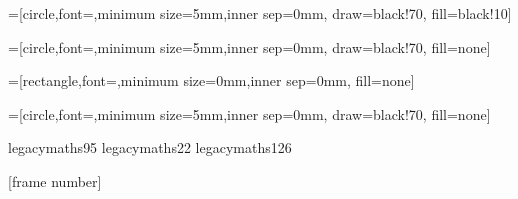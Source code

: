 =[circle,font=\small,minimum size=5mm,inner sep=0mm,
                                    draw=black!70,
                                    fill=black!10]

=[circle,font=\small,minimum size=5mm,inner sep=0mm,
                                   draw=black!70,
                                    fill=none]

=[rectangle,font=\small,minimum size=0mm,inner sep=0mm,
                                    fill=none]

=[circle,font=\small,minimum size=5mm,inner sep=0mm,
                                   draw=black!70,
                                    fill=none]
\usepackage{tikz}
\usetikzlibrary{shapes}
\usetikzlibrary{positioning,shapes,trees,arrows,shadows,arrows.meta,backgrounds,fit}




\graphicspath{{../images/}}

\DeclareMathAccent{\dot}     {\mathalpha}{legacymaths}{95}
\DeclareMathAccent{\bar}     {\mathalpha}{legacymaths}{22}
\DeclareMathAccent{\tilde}     {\mathalpha}{legacymaths}{126}

[frame number]

